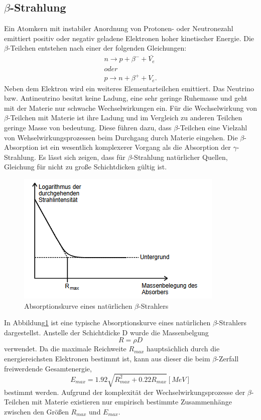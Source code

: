 \subsection{\texorpdfstring{$\beta$}{Beta}-Strahlung}
Ein Atomkern mit instabiler Anordnung von Protonen- oder Neutronezahl emittiert positiv oder negativ geladene Elektronen hoher kinetischer Energie.
Die $\beta$-Teilchen entstehen nach einer der folgenden Gleichungen:
\begin{eqnarray}
n \rightarrow p + \beta^- + \bar{V_e} \\
\nonumber
oder\\
p \rightarrow n + \beta^+ + V_e .
\end{eqnarray}
Neben dem Elektron wird ein weiteres Elementarteilchen emittiert.
Das Neutrino bzw. Antineutrino besitzt keine Ladung, eine sehr geringe Ruhemasse und geht mit der Materie nur schwache Wechselwirkungen ein.
Für die Wechselwirkung von $\beta$-Teilchen mit Materie ist ihre Ladung und im Vergleich zu anderen Teilchen geringe Masse von bedeutung.
Diese führen dazu, dass $\beta$-Teilchen eine Vielzahl von Wehselwirkungsprozessen beim Durchgang durch Materie eingehen.
Die $\beta$-Absorption ist ein wesentlich komplexerer Vorgang als die Absorption der $\gamma$-Strahlung.
Es lässt sich zeigen, dass für $\beta$-Strahlung natürlicher Quellen, Gleichung für nicht zu große Schichtdicken gültig ist.
\begin{figure}[H]
    \centering
    \includegraphics[scale=0.7]{content/Absorbbeta.png}
    \caption{Absorptionskurve eines natürlichen $\beta$-Strahlers}
    \label{fig:abs}
\end{figure}
\noindent
In Abbildung\ref{fig:abs} ist eine typische Absorptionskurve eines natürlichen $\beta$-Strahlers dargestellst.
Anstelle der Schichtdicke D wurde die Massenbelgung
\begin{equation}
  R = \rho D
\end{equation}
verwendet.
Da die maximale Reichweite $R_{max}$ hauptsächlich durch die energiereichsten Elektronen bestimmt ist, kann aus dieser die beim $\beta$-Zerfall freiwerdende Gesamtenergie,
\begin{equation}
  E_{max}= 1.92  \sqrt{R_{max}^2 +0.22R_{max}} [MeV]
\end{equation}
bestimmt werden.
Aufgrund der komplexität der Wechselwirkungsprozesse der $\beta$-Teilchen mit Materie existieren nur empirisch bestimmte Zusammenhänge zwischen den Größen $R_{max}$ und $E_{max}$.
